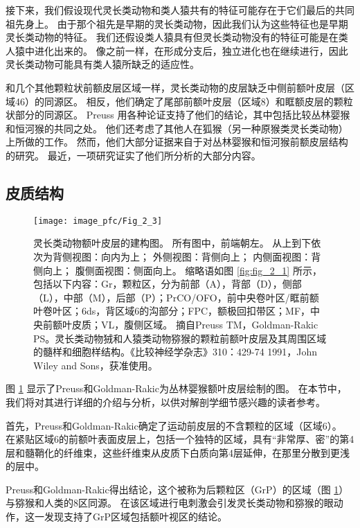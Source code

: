 接下来，我们假设现代灵长类动物和类人猿共有的特征可能存在于它们最后的共同祖先身上。
由于那个祖先是早期的灵长类动物，因此我们认为这些特征也是早期灵长类动物的特征。
我们还假设类人猿具有但灵长类动物没有的特征可能是在类人猿中进化出来的。
像之前一样，在形成分支后，独立进化也在继续进行，因此灵长类动物可能具有类人猿所缺乏的适应性。


和几个其他颗粒状前额皮层区域一样\cite{Preuss1991a}，灵长类动物的皮层缺乏中侧前额叶皮层（区域46）的同源区。
相反，他们确定了尾部前额叶皮层（区域8）和眶额皮层的颗粒状部分的同源区。
Preuss 用各种论证支持了他们的结论，其中包括比较丛林婴猴和恒河猴的共同之处\cite{preuss1991ipsilateral}。
他们还考虑了其他人在狐猴（另一种原猴类灵长类动物）上所做的工作。
然而，他们大部分证据来自于对丛林婴猴和恒河猴前额皮层结构的研究。
最近，一项研究证实了他们所分析的大部分内容\cite{wong2010architectonic}。


\subsection{皮质结构}

\begin{figure}[!htb]
	\centering
	\texttt{[image: image\_pfc/Fig\_2\_3]}
	\caption{灵长类动物额叶皮层的建构图。
		所有图中，前端朝左。
		从上到下依次为背侧视图：向内为上；
		外侧视图：背侧向上；
		内侧面视图：背侧向上；
		腹侧面视图：侧面向上。
		缩略语如图 \ref{fig:fig_2_1} 所示，包括以下内容：Gr，颗粒区，分为前部（A），背部（D），侧部（L），中部（M），后部（P）；PrCO/OFO，前中央卷叶区/眶前额叶卷叶区；6ds，背区域6的沟部分；FPC，额极回扣带区；MF，中央前额叶皮质；VL，腹侧区域。
		摘自Preuss TM，Goldman-Rakic PS。灵长类动物狨和人猿类动物猕猴的颗粒前额叶皮层及其周围区域的髓样和细胞样结构。《比较神经学杂志》310：429-74  1991，John Wiley and Sons，获准使用。\label{fig:fig_2_3}}
\end{figure}

图 \ref{fig:fig_2_3} 显示了Preuss和Goldman-Rakic为丛林婴猴额叶皮层绘制的图。
在本节中，我们将对其进行详细的介绍与分析，以供对解剖学细节感兴趣的读者参考。


首先，Preuss和Goldman-Rakic确定了运动前皮层的不含颗粒的区域（区域6）。
在紧贴区域6的前额叶表面皮层上，包括一个独特的区域，具有“非常厚、密”的第4层和髓鞘化的纤维束，这些纤维束从皮质下白质向第4层延伸，在那里分散到更浅的层中。


Preuss和Goldman-Rakic得出结论，这个被称为后颗粒区（GrP）的区域（图 \ref{fig:fig_2_3}）与猕猴和人类的8区同源。
在该区域进行电刺激会引发灵长类动物\cite{wu2000converging}和猕猴\cite{bruce1985primate}的眼动作，这一发现支持了GrP区域包括额叶视区的结论。


